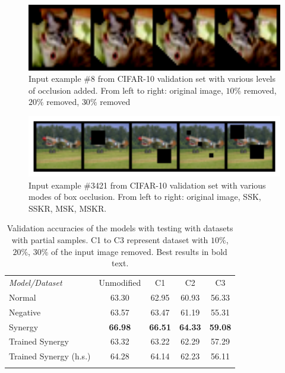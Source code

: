 \documentclass[b5paper]{book}
\begin{document}
\begin{figure}
    \centering
    \includegraphics[width=1\textwidth]{figures/fig3.png}
\caption{Input example \#8 from CIFAR-10 validation set with various levels of occlusion added. From left to right: original image, \( 10\% \) removed, \( 20\% \) removed, \( 30\% \) removed}
\label{fig:3} 
\end{figure}

\begin{figure}
    \centering
    \includegraphics[width=1\textwidth]{figures/fig4.png}
\caption{Input example \#3421 from CIFAR-10 validation set with various modes of box occlusion. From left to right: original image, SSK, SSKR, MSK, MSKR.}
\label{fig:4} 
\end{figure}

\begin{table}
\centering
\caption{Validation accuracies of the models with testing with datasets with partial samples. C1 to C3 represent dataset with \( 10\% \), \( 20\% \), \( 30\% \) of the input image removed. Best results in bold text.}
\label{tab:8}
\tabcolsep=0.06cm
\begin{tabular}{lcccc}
\hline\noalign{\smallskip}
\emph{Model/Dataset} & Unmodified & C1 & C2 & C3 \\
\noalign{\smallskip}\hline\noalign{\smallskip}
Normal & 63.30 & 62.95 & 60.93 & 56.33 \\
Negative & 63.57 & 63.47 & 61.19 & 55.31 \\
Synergy & \textbf{66.98} & \textbf{66.51} & \textbf{64.33} & \textbf{59.08}\\
Trained Synergy & 63.32 & 63.22 & 62.29 & 57.29\\
Trained Synergy (h.s.) & 64.28 & 64.14 & 62.23 & 56.11\\
\noalign{\smallskip}\hline
\end{tabular}
\end{table}
\end{document}
